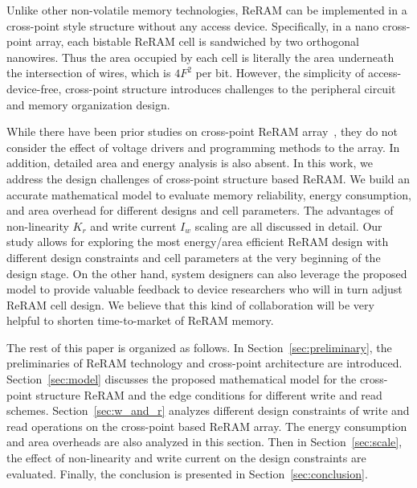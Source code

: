 Unlike other non-volatile memory technologies, ReRAM can be implemented in
a cross-point style structure without any access device. Specifically, in
a nano cross-point array, each bistable ReRAM cell is sandwiched by two
orthogonal nanowires. Thus the area occupied by each cell is literally the
area underneath the intersection of wires, which is $4F^2$ per bit.
However, the simplicity of access-device-free, cross-point structure
introduces challenges to the peripheral circuit and memory organization
design.

While there have been prior studies on cross-point ReRAM
array~\cite{crossbar_NANO2002_Ziegler,crossbar_NANO08_Flocke,crossbar_TED_2010,crossbar_NANO2003_Ziegler},
they do not consider the effect of voltage drivers and programming methods
to the array. In addition, detailed area and energy analysis is also
absent. In this work, we address the design challenges of cross-point
structure based ReRAM. We build an accurate mathematical model to evaluate
memory reliability, energy consumption, and area overhead for different
designs and cell parameters. The advantages of non-linearity $K_r$ and write
current $I_w$ scaling are all discussed in detail. Our study allows for
exploring the most energy/area efficient ReRAM design with different
design constraints and cell parameters at the very beginning of the design
stage. On the other hand, system designers can also leverage the proposed
model to provide valuable feedback to device researchers who will in turn
adjust ReRAM cell design. We believe that this kind of collaboration will
be very helpful to shorten time-to-market of ReRAM memory.

The rest of this paper is organized as follows. In
Section~\ref{sec:preliminary}, the preliminaries of ReRAM technology and
cross-point architecture are introduced. Section~\ref{sec:model} discusses
the proposed mathematical model  for the cross-point structure ReRAM and the
edge conditions for different write and read schemes.
Section~\ref{sec:w_and_r} analyzes different design constraints of write
and read operations on the cross-point based ReRAM array. The energy
consumption and area overheads are also analyzed in this section. Then in
Section~\ref{sec:scale}, the effect of non-linearity and write current on
the design constraints are evaluated. Finally, the conclusion is presented
in Section~\ref{sec:conclusion}.
